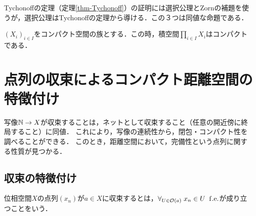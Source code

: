 \documentclass[uplatex,dvipdfmx]{jsreport}
\begin{document}
\begin{remark}
    Tychonoffの定理（定理\ref{thm-Tychonoff}）の証明には選択公理とZornの補題を使うが，選択公理はTychonoffの定理から導ける．この３つは同値な命題である．
\end{remark}

\begin{theorem}[Tychonoff]
    $(X_i)_{i\in I}$をコンパクト空間の族とする．この時，積空間$\prod_{i\in I}X_i$はコンパクトである．
\end{theorem}

\section{点列の収束によるコンパクト距離空間の特徴付け}

\begin{tcolorbox}[colframe=ForestGreen, colback=ForestGreen!10!white,breakable,colbacktitle=ForestGreen!40!white,coltitle=black,fonttitle=\bfseries\sffamily,
title=完備性の発見]
    写像$\mathbb{N}\to X$が収束することは，ネットとして収束すること（任意の開近傍に終局すること）に同値．
    これにより，写像の連続性から，閉包・コンパクト性を調べることができる．
    このとき，距離空間において，完備性という点列に関する性質が見つかる．
\end{tcolorbox}

\subsection{収束の特徴付け}

\begin{definition}
    位相空間$X$の点列$(x_n)$が$a\in X$に収束するとは，$\forall_{U\in\mathcal{O}(a)}\;x_n\in U\;\;\mathrm{f.e.}$が成り立つことをいう．
\end{definition}
\end{document}
